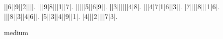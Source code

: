 \begin{sudoku}
||6||9||2||||.
|||9|8|||1||7|.
|||||5||6|9||.
||3||||||4|8|.
|||4|7|1|6||3||.
|7||||8|||1|6|.
|||8||3||4|6||.
|5||3||4||9||1|.
|4|||2||||7|3|.
\end{sudoku}
\begin{center}
medium\end{center}